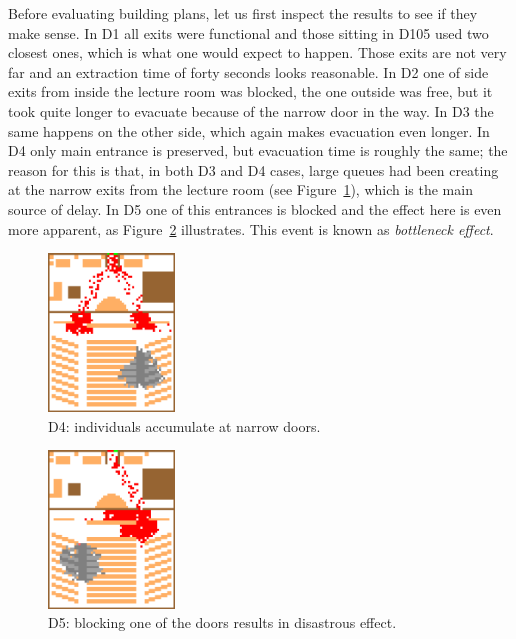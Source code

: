 Before evaluating building plans, let us first inspect the results to see if
they make sense.
In D1 all exits were functional and those sitting in D105 used two closest ones,
which is what one would expect to happen.
Those exits are not very far and an extraction time of forty seconds looks
reasonable.
In D2 one of side exits from inside the lecture room was blocked, the one
outside was free, but it took quite longer to evacuate because of the
narrow door in the way.
In D3 the same happens on the other side, which again makes evacuation even
longer.
In D4 only main entrance is preserved, but evacuation time is roughly the same;
the reason for this is that, in both D3 and D4 cases, large queues had been
creating at the narrow exits from the lecture room
(see Figure~\ref{fig:d4bn}), which is the main source of delay.
In D5 one of this entrances is blocked and the effect here is even more
apparent, as Figure~\ref{fig:d5bn} illustrates.
This event is known as \emph{bottleneck effect}.

\begin{figure}
    \includegraphics[width=0.3\textwidth]{figures/d4bn.eps}
    \caption{D4: individuals accumulate at narrow doors.}
    \label{fig:d4bn}
\end{figure}

\begin{figure}
    \includegraphics[width=0.3\textwidth]{figures/d5bn.eps}
    \caption{D5: blocking one of the doors results in disastrous effect.}
    \label{fig:d5bn}
\end{figure}

